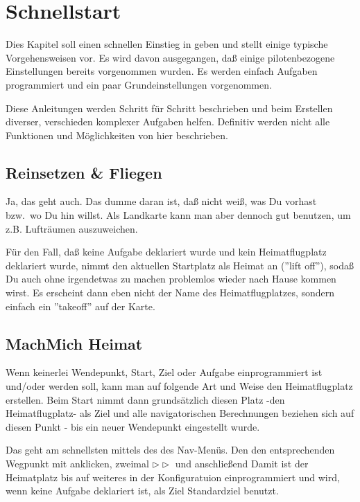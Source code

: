 \chapter{Schnellstart}\label{cha:quickstart}

Dies Kapitel soll einen schnellen Einstieg in \xc geben und stellt einige typische Vorgehensweisen vor.
Es wird davon ausgegangen, daß einige pilotenbezogene Einstellungen bereits vorgenommen wurden.
Es werden einfach Aufgaben programmiert und ein paar Grundeinstellungen vorgenommen.

Diese Anleitungen werden Schritt für Schritt beschrieben und beim Erstellen diverser, verschieden komplexer
Aufgaben helfen. Definitiv  werden nicht alle Funktionen und Möglichkeiten von \xc hier beschrieben.

\section{Reinsetzen \& Fliegen}
Ja, das geht auch. Das dumme daran ist, daß \xc nicht weiß, was Du vorhast bzw.\ wo Du hin willst.
Als Landkarte kann man \xc aber dennoch gut benutzen, um z.B. Lufträumen auszuweichen.

Für den Fall, daß keine Aufgabe deklariert wurde und kein Heimatflugplatz deklariert wurde, nimmt \xc den aktuellen Startplatz als Heimat an (''lift off''),
sodaß Du auch ohne irgendetwas zu machen problemlos wieder nach Hause kommen wirst.
Es erscheint dann eben nicht der Name des Heimatflugplatzes, sondern einfach ein ''takeoff'' auf der Karte.

\section{MachMich Heimat}
Wenn keinerlei Wendepunkt, Start, Ziel oder Aufgabe einprogrammiert ist und/oder werden soll, kann man auf
folgende Art und Weise den Heimatflugplatz erstellen.
Beim Start nimmt  \xc dann grundsätzlich diesen Platz -den Heimatflugplatz- als Ziel und alle
navigatorischen Berechnungen beziehen sich auf diesen Punkt - bis ein neuer Wendepunkt eingestellt wurde.

Das geht am schnellsten mittels des  des Nav-Menüs.  Den den entsprechenden Wegpunkt mit  anklicken,
zweimal  $\triangleright\triangleright$ und anschließend  
Damit ist der Heimatplatz bis auf weiteres in der Konfiguratuion einprogrammiert und wird, wenn keine Aufgabe deklariert ist, als Ziel
Standardziel benutzt.

